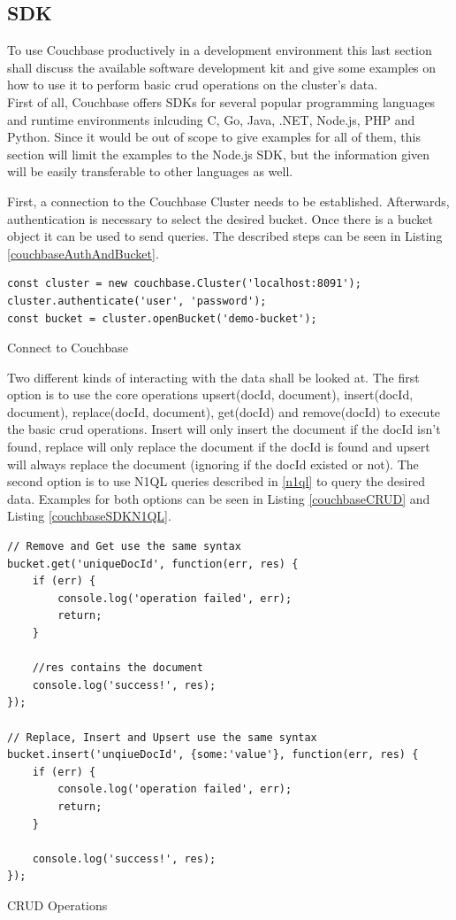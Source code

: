 \subsection{SDK}
\label{section:SDK}
To use Couchbase productively in a development environment this last section shall discuss the available software development kit and give some examples on how to use it to perform basic \gls{crud} operations on the cluster's data.\\
First of all, Couchbase offers SDKs for several popular programming languages and runtime environments inlcuding C, Go, Java, .NET, Node.js, PHP and Python. \parencite{couchbaseSDK} Since it would be out of scope to give examples for all of them, this section will limit the examples to the Node.js SDK, but the information given will be easily transferable to other languages as well.

First, a connection to the Couchbase Cluster needs to be established. Afterwards, authentication is necessary to select the desired bucket. Once there is a bucket object it can be used to send queries. The described steps can be seen in Listing \ref{couchbaseAuthAndBucket}.\\
\begin{listing}[ht]
\begin{verbatim}
const cluster = new couchbase.Cluster('localhost:8091');
cluster.authenticate('user', 'password');
const bucket = cluster.openBucket('demo-bucket');
\end{verbatim}
\caption{Connect to Couchbase}
\label{couchbaseAuthAndBucket}
\end{listing}

\newpage
Two different kinds of interacting with the data shall be looked at. The first option is to use the core operations upsert(docId, document), insert(docId, document), replace(docId, document), get(docId) and remove(docId) to execute the basic \gls{crud} operations. Insert will only insert the document if the docId isn't found, replace will only replace the document if the docId is found and upsert will always replace the document (ignoring if the docId existed or not). The second option is to use N1QL queries described in \autoref{n1ql} to query the desired data. Examples for both options can be seen in Listing \ref{couchbaseCRUD} and Listing \ref{couchbaseSDKN1QL}.\\

\begin{listing}[ht]
\begin{verbatim}
// Remove and Get use the same syntax
bucket.get('uniqueDocId', function(err, res) {
    if (err) {
        console.log('operation failed', err);
        return;
    }
    
    //res contains the document
    console.log('success!', res);
});

// Replace, Insert and Upsert use the same syntax
bucket.insert('unqiueDocId', {some:'value'}, function(err, res) {
    if (err) {
        console.log('operation failed', err);
        return;
    }

    console.log('success!', res);
});
\end{verbatim}
\caption{CRUD Operations}
\label{couchbaseCRUD}
\end{listing}

